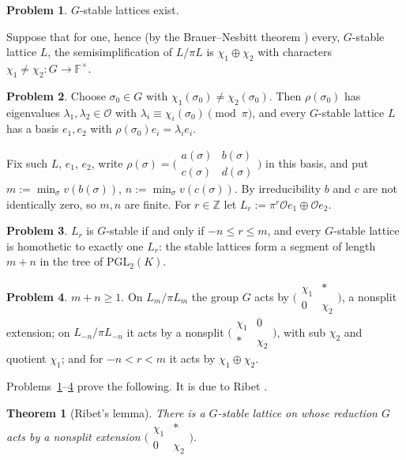 \documentclass[reqno]{amsart}
\theoremstyle{definition}
\newtheorem{problem}{Problem}[section]
\theoremstyle{plain}
\newtheorem{theorem}{Theorem}[section]
\newcommand{\Z}{\mathbb{Z}}
\newcommand{\F}{\mathbb{F}}
\newcommand{\Oc}{\mathcal{O}}
\newcommand{\mat}[4]{\bigl(\begin{smallmatrix} #1 & #2 \\ #3 & #4 \end{smallmatrix}\bigr)}
\begin{document}
\begin{problem}\label{pr:stable}
\(G\)-stable lattices exist.
\end{problem}

Suppose that for one, hence (by the Brauer--Nesbitt theorem \cite[(30.16)]{CR}) every, \(G\)-stable lattice \(L\), the semisimplification of \(L/\pi L\) is \(\chi_1 \oplus \chi_2\) with characters \(\chi_1 \ne \chi_2 \colon G \to \F^\times\).

\begin{problem}\label{pr:diag}
Choose \(\sigma_0 \in G\) with \(\chi_1(\sigma_0) \ne \chi_2(\sigma_0)\).  Then \(\rho(\sigma_0)\) has eigenvalues \(\lambda_1, \lambda_2 \in \Oc\) with \(\lambda_i \equiv \chi_i(\sigma_0) \pmod \pi\), and every \(G\)-stable lattice \(L\) has a basis \(e_1, e_2\) with \(\rho(\sigma_0) e_i = \lambda_i e_i\).
\end{problem}

Fix such \(L\), \(e_1\), \(e_2\), write \(\rho(\sigma) = \mat{a(\sigma)}{b(\sigma)}{c(\sigma)}{d(\sigma)}\) in this basis, and put \(m := \min_\sigma v(b(\sigma))\), \(n := \min_\sigma v(c(\sigma))\).  By irreducibility \(b\) and \(c\) are not identically zero, so \(m, n\) are finite.  For \(r \in \Z\) let \(L_r := \pi^r \Oc e_1 \oplus \Oc e_2\).

\begin{problem}\label{pr:segment}
\(L_r\) is \(G\)-stable if and only if \(-n \le r \le m\), and every \(G\)-stable lattice is homothetic to exactly one \(L_r\): the stable lattices form a segment of length \(m+n\) in the tree of \(\mathrm{PGL}_2(K)\).
\end{problem}

\begin{problem}\label{pr:ends}
\(m + n \ge 1\).  On \(L_m/\pi L_m\) the group \(G\) acts by \(\mat{\chi_1}{*}{0}{\chi_2}\), a nonsplit extension; on \(L_{-n}/\pi L_{-n}\) it acts by a nonsplit \(\mat{\chi_1}{0}{*}{\chi_2}\), with sub \(\chi_2\) and quotient \(\chi_1\); and for \(-n < r < m\) it acts by \(\chi_1 \oplus \chi_2\).
\end{problem}

Problems~\ref{pr:stable}--\ref{pr:ends} prove the following.  It is due to Ribet \cite[Prop.~2.1]{Ri}.

\begin{theorem}[Ribet's lemma]\label{thm:ribet-lemma}
There is a \(G\)-stable lattice on whose reduction \(G\) acts by a nonsplit extension \(\mat{\chi_1}{*}{0}{\chi_2}\).
\end{theorem}
\end{document}
